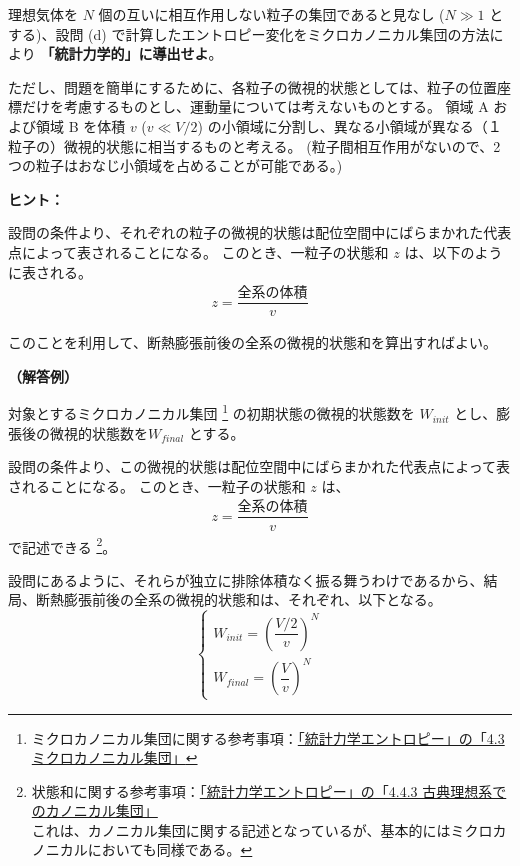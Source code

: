 \documentclass[uplatex,dvipdfmx,a4paper,11pt]{jsarticle}
\begin{document}
\newpage


理想気体を $N$ 個の互いに相互作用しない粒子の集団であると見なし ($N \gg 1$ とする)、設問 (d) で計算したエントロピー変化をミクロカノニカル集団の方法により {\bf 「統計力学的」に導出せよ}。

ただし、問題を簡単にするために、各粒子の微視的状態としては、粒子の位置座標だけを考慮するものとし、運動量については考えないものとする。
領域 A および領域 B を体積 $v$ ($v \ll V/2$) の小領域に分割し、異なる小領域が異なる（１粒子の）微視的状態に相当するものと考える。
(粒子間相互作用がないので、2つの粒子はおなじ小領域を占めることが可能である。)

\begin{itembox}[l]{{\bf ヒント：}}

設問の条件より、それぞれの粒子の微視的状態は配位空間中にばらまかれた代表点によって表されることになる。
このとき、一粒子の状態和 $z$ は、以下のように表される。
\begin{align*}
z = \dfrac{\text{全系の体積}}{v}
\end{align*}

このことを利用して、断熱膨張前後の全系の微視的状態和を算出すればよい。

\end{itembox}

{\bf （解答例）}

対象とするミクロカノニカル集団
\footnote{
ミクロカノニカル集団に関する参考事項：\href{http://kisokouza.island.ac/documents/Stat_Phys_Entropy.pdf}{「統計力学エントロピー」の「4.3 ミクロカノニカル集団」}
}
の初期状態の微視的状態数を $W_{init}$ とし、膨張後の微視的状態数を$W_{final}$ とする。

設問の条件より、この微視的状態は配位空間中にばらまかれた代表点によって表されることになる。
このとき、一粒子の状態和 $z$ は、
\begin{align*}
z = \dfrac{\text{全系の体積}}{v}
\end{align*}
で記述できる
\footnote{
状態和に関する参考事項：\href{http://kisokouza.island.ac/documents/Stat_Phys_Entropy.pdf}{「統計力学エントロピー」の「4.4.3 古典理想系でのカノニカル集団」}\\
これは、カノニカル集団に関する記述となっているが、基本的にはミクロカノニカルにおいても同様である。
}。

設問にあるように、それらが独立に排除体積なく振る舞うわけであるから、結局、断熱膨張前後の全系の微視的状態和は、それぞれ、以下となる。
\begin{equation*}
\begin{cases}
W_{init} = \left( \dfrac{V/2}{v} \right)^N \\[10pt]
W_{final} = \left( \dfrac{V}{v} \right)^N
\end{cases}
\end{equation*}
\end{document}
